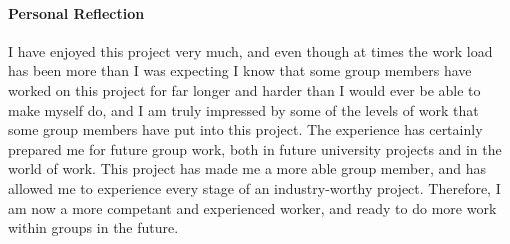 \documentclass{project}
\begin{document}
\paragraph{Personal Reflection}
I have enjoyed this project very much, and even though at times the work load has been more than I was expecting I know that some group members have worked on this project for far longer and harder than I would ever be able to make myself do, and I am truly impressed by some of the levels of work that some group members have put into this project. The experience has certainly prepared me for future group work, both in future university projects and in the world of work. This project has made me a more able group member, and has allowed me to experience every stage of an industry-worthy project. Therefore, I am now a more competant and experienced worker, and ready to do more work within groups in the future.
\label{thelastpage}
\end{document}
